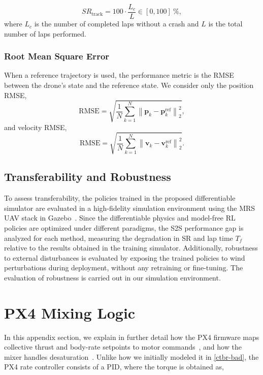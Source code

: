 \begin{equation}
    \mathit{SR}_{\text{track}} = 100\cdot\frac{L_c}{L} \in [0, 100]\ \%,
\end{equation}
where $L_c$ is the number of completed laps without a crash and $L$ is the total number of laps performed.


\subsubsection{Root Mean Square Error}
When a reference trajectory is used, the performance metric is the \ac{RMSE} between the drone's state and the reference state.
We consider only the position \ac{RMSE},
\begin{equation}
  \mathrm{RMSE} = \sqrt{\frac{1}{N} \sum_{k=1}^N \left\|\mathbf{p}_k - \mathbf{p}^{\mathrm{ref}}_k\right\|_2^2 },
\end{equation}
and velocity \ac{RMSE},
\begin{equation}
  \mathrm{RMSE} = \sqrt{\frac{1}{N} \sum_{k=1}^N \left\|\mathbf{v}_k - \mathbf{v}^{\mathrm{ref}}_k\right\|_2^2 }.
\end{equation}

\subsection{Transferability and Robustness}\label{subsec:transfer}

To assess transferability, the policies trained in the proposed differentiable simulator are evaluated in a high-fidelity simulation environment using the MRS UAV stack in Gazebo~\cite{baca_mrs_2021}.
Since the differentiable physics and model-free \ac{RL} policies are optimized under different paradigms, the \ac{S2S} performance gap is analyzed for each method, measuring the degradation in \ac{SR} and lap time $T_f$ relative to the results obtained in the training simulator.
Additionally, robustness to external disturbances is evaluated by exposing the trained policies to wind perturbations during deployment, without any retraining or fine-tuning.
The evaluation of robustness is carried out in our simulation environment.



\section{PX4 Mixing Logic}\label{px4-mixing}
In this appendix section, we explain in further detail how the PX4 firmware maps collective thrust and body-rate setpoints to motor commands~\cite{px4_ctrl}, and how the mixer handles desaturation~\cite{px4_desat}.
Unlike how we initially modeled it in \autoref{ctbr-bad}, the PX4 rate controller consists of a \ac{PID}, where the torque is obtained as,

